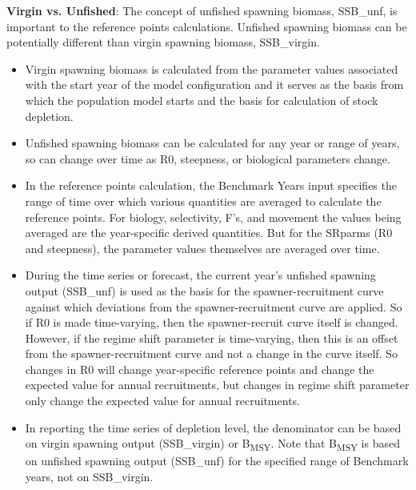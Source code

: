 \noindent \textbf{Virgin vs. Unfished}: The concept of unfished spawning biomass, SSB\_unf, is important to the reference points calculations.  Unfished spawning biomass can be potentially different than virgin spawning biomass, SSB\_virgin.  
\begin{itemize}
	\item Virgin spawning biomass is calculated from the parameter values associated with the start year of the model configuration and it serves as the basis from which the population model starts and the basis for calculation of stock depletion.
	\item Unfished spawning biomass can be calculated for any year or range of years, so can change over time as R0, steepness, or biological parameters change.
	\item In the reference points calculation, the Benchmark Years input specifies the range of time over which various quantities are averaged to calculate the reference points.  For biology, selectivity, F’s, and movement the values being averaged are the year-specific derived quantities.  But for the SRparms (R0 and steepness), the parameter values themselves are averaged over time.
	\item During the time series or forecast, the current year’s unfished spawning output (SSB\_unf) is used as the basis for the spawner-recruitment curve against which deviations from the spawner-recruitment curve are applied.  So if R0 is made time-varying, then the spawner-recruit curve itself is changed.  However, if the regime shift parameter is time-varying, then this is an offset from the spawner-recruitment curve and not a change in the curve itself.  So changes in R0 will change year-specific reference points and change the expected value for annual recruitments, but changes in regime shift parameter only change the expected value for annual recruitments.
	\item In reporting the time series of depletion level, the denominator can be based on virgin spawning output (SSB\_virgin) or B\textsubscript{MSY}.  Note that B\textsubscript{MSY} is based on unfished spawning output (SSB\_unf) for the specified range of Benchmark years, not on SSB\_virgin.
\end{itemize}


\hypertarget{ForeSpawn}{}
